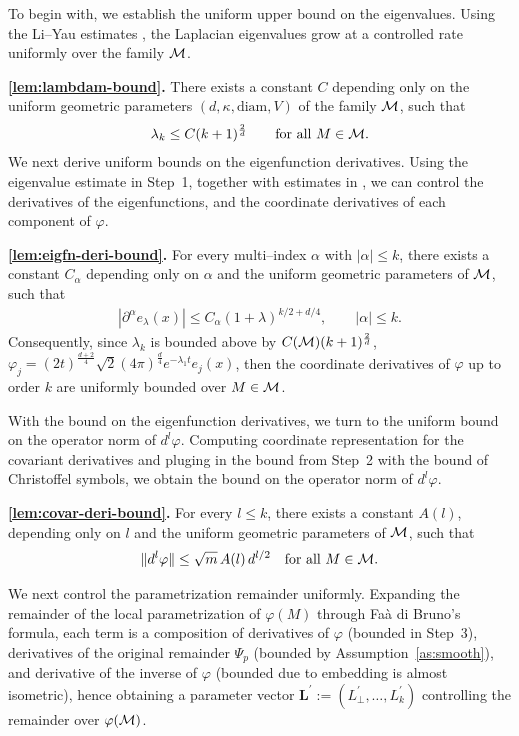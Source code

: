 To begin with, we establish the uniform upper bound on the eigenvalues.
Using the Li--Yau estimates \cite[Thm. 16]{esteigenvalue}, the Laplacian eigenvalues grow at a controlled rate uniformly over the family $\mathcal{M}$.

\textbf{\cref{lem:lambdam-bound}.} 	There exists a constant $C$ depending only on the uniform geometric parameters $(d,\kappa,\mathrm{diam},V)$ of the family $\mathcal{M}$, such that
	\begin{align}
		\lambda_k \leq C (k+1)^\frac{2}{d} \qquad \text{for all } M \in \mathcal{M}.
	\end{align}
We next derive uniform bounds on the eigenfunction derivatives.
Using the eigenvalue estimate in Step~1, together with estimates in \cite{2004Xuhigherorder}, we can control the derivatives of the eigenfunctions, and the coordinate derivatives of each component of $\varphi$.

\textbf{\cref{lem:eigfn-deri-bound}.} 
For every multi--index $\alpha$ with $|\alpha| \leq k$, there exists a constant $C_\alpha$ depending only on $\alpha$ and the uniform geometric parameters of $\mathcal{M}$, such that
	\begin{align}
		|\partial^\alpha e_\lambda(x)| \leq C_\alpha (1+\lambda)^{k/2+d/4}, \qquad |\alpha| \leq k.
	\end{align}
Consequently, since $\lambda_k$ is bounded above by $C(\mathcal{M})(k+1)^\frac{2}{d}$, $\varphi_j = (2t)^\frac{d+2}{4}\sqrt{2}(4\pi)^\frac{d}{4}e^{-\lambda_1 t}e_j(x)$, then the coordinate derivatives of $\varphi$ up to order $k$ are uniformly bounded over $M \in \mathcal{M}$.


With the bound on the eigenfunction derivatives, we turn to the uniform bound on the operator norm of $d^l\varphi$.
Computing coordinate representation for the covariant derivatives and pluging in the bound from Step~2 with the bound of Christoffel symbols, we obtain the bound on the operator norm of $d^l \varphi$.

\textbf{\cref{lem:covar-deri-bound}.} 
For every $l \leq k$, there exists a constant $A(l)$, depending only on $l$ and the uniform geometric parameters of $\mathcal{M}$, such that
	\begin{align}
		\|d^l \varphi\| \leq \sqrt{m}\,A(l)\,d^{l/2} \quad \text{for all } M \in \mathcal{M}.
	\end{align}

We next control the parametrization remainder uniformly.
Expanding the remainder of the local parametrization of $\varphi(M)$ through
Fa\`a di Bruno's formula, each term is a composition of derivatives of $\varphi$
(bounded in Step~3), derivatives of the original remainder $\Psi_p$ (bounded
by Assumption~\ref{as:smooth}), and derivative of the inverse of $\varphi$ (bounded due to embedding is almost isometric), hence obtaining a parameter vector $\textbf{L}^\prime:=\left(L_\perp^\prime,\dots,L_k^\prime\right)$ controlling the remainder over $\varphi(\mathcal{M})$.
	
